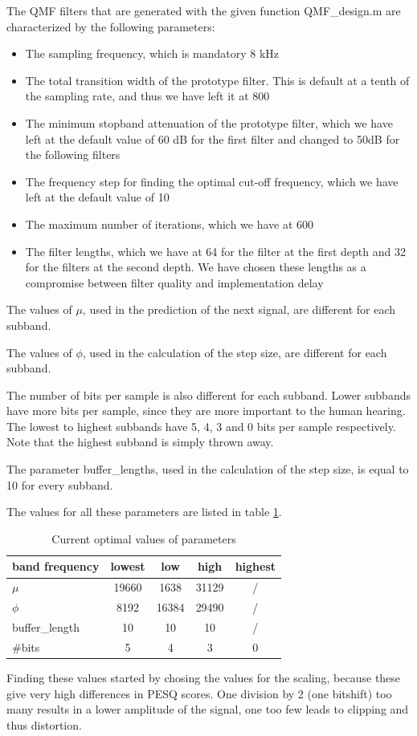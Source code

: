 \documentclass[a4paper]{article}
\begin{document}
The QMF filters that are generated with the given function QMF\_design.m are characterized by the following parameters:

\begin{itemize}
\item The sampling frequency, which is mandatory 8 kHz
\item The total transition width of the prototype filter. This is default at a tenth of the sampling rate, and thus we have left it at 800
\item The minimum stopband attenuation of the prototype filter, which we have left at the default value of 60 dB for the first filter and changed to 50dB for the following filters
\item The frequency step for finding the optimal cut-off frequency, which we have left at the default value of 10
\item The maximum number of iterations, which we have at 600
\item The filter lengths, which we have at 64 for the filter at the first depth and 32 for the filters at the second depth. We have chosen these lengths as a compromise between filter quality and implementation delay
\
\end{itemize}

The values of $\mu$, used in the prediction of the next signal, are different for each subband. 

The values of $\phi$, used in the calculation of the step size, are different for each subband. 

The number of bits per sample is also different for each subband. Lower subbands have more bits per sample, since they are more important to the human hearing. The lowest to highest subbands have 5, 4, 3 and 0 bits per sample respectively. Note that the highest subband is simply thrown away.

The parameter buffer\_lengths, used in the calculation of the step size, is equal to 10 for every subband.

The values for all these parameters are listed in table \ref{tab:parametervalues}.

\begin{table}
\begin{tabular}{l|cccc} 
band frequency & lowest & low & high & highest \\ 
\hline 
$\mu$ & 19660 & 1638 & 31129 & / \\  
$\phi$ & 8192 & 16384 & 29490 & / \\  
buffer\_length & 10 & 10 & 10 & / \\  
\#bits & 5 & 4 & 3 & 0 \\ 
\hline 
\end{tabular}
\caption{Current optimal values of parameters}
\label{tab:parametervalues}
\end{table}
Finding these values started by chosing the values for the scaling, because these give very high differences in PESQ scores. One division by 2 (one bitshift) too many results in a lower amplitude of the signal, one too few leads to clipping and thus distortion. 
\end{document}
